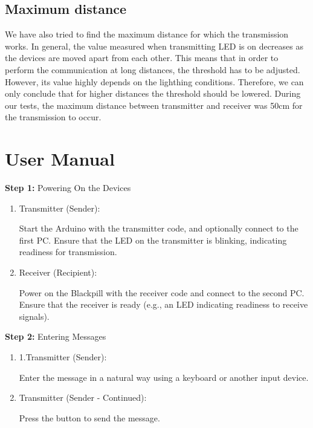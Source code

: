 \documentclass[12pt]{article}
\begin{document}
  \subsection{Maximum distance}
  We have also tried to find the maximum distance for which the transmission works. In general, the value measured when transmitting LED is on decreases
  as the devices are moved apart from each other. This means that in order to perform the communication at long distances, the threshold has to be adjusted.
  However, its value highly depends on the lighthing conditions. Therefore, we can only conclude that for higher distances the threshold should be lowered.
  During our tests, the maximum distance between transmitter and receiver was 50cm for the transmission to occur.

	
  \newpage
	\section{User Manual}
  \textbf{Step 1:} Powering On the Devices

  \begin{enumerate}[label=\alph*).]
    \item Transmitter (Sender):

Start the Arduino with the transmitter code, and optionally connect to the first PC.
Ensure that the LED on the transmitter is blinking, indicating readiness for transmission.

\item Receiver (Recipient):

Power on the Blackpill with the receiver code and connect to the second PC.
Ensure that the receiver is ready (e.g., an LED indicating readiness to receive signals).
  \end{enumerate}


\noindent\textbf{Step 2:} Entering Messages
\begin{enumerate}
  \item 1.Transmitter (Sender):

  Enter the message in a natural way using a keyboard or another input device.

\item Transmitter (Sender - Continued):

Press the button to send the message.
\end{enumerate}
\end{document}
